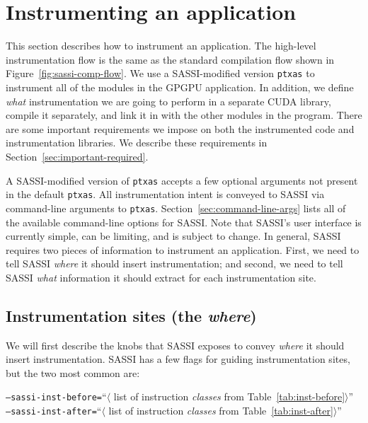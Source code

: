 \section{Instrumenting an application}

This section describes how to instrument an application.  The
high-level instrumentation flow is the same as the standard
compilation flow shown in Figure~\ref{fig:sassi-comp-flow}.  We use a
SASSI-modified version \texttt{ptxas} to instrument all of the modules
in the GPGPU application.  In addition, we define \emph{what}
instrumentation we are going to perform in a separate CUDA library,
compile it separately, and link it in with the other modules in the
program.  There are some important requirements we impose on both the
instrumented code and instrumentation libraries.  We describe these
requirements in Section~\ref{sec:important-required}.

A SASSI-modified version of \texttt{ptxas} accepts a few optional
arguments not present in the default \texttt{ptxas}.  All
instrumentation intent is conveyed to SASSI via command-line arguments
to \texttt{ptxas}.  Section~\ref{sec:command-line-args} lists all of
the available command-line options for SASSI.  Note that SASSI's user
interface is currently simple, can be limiting, and is subject to
change. In general, SASSI requires two pieces of information to
instrument an application.  First, we need to tell SASSI \emph{where}
it should insert instrumentation; and second, we need to tell SASSI
\emph{what} information it should extract for each instrumentation
site.

\subsection{Instrumentation sites (the \emph{where})}

We will first describe the knobs that SASSI exposes to convey
\emph{where} it should insert instrumentation.  SASSI has a few flags
for guiding instrumentation sites, but the two most common are:\\
\begin{center}
\texttt{--sassi-inst-before=}``$\langle$ list of instruction
\emph{classes} from Table~\ref{tab:inst-before}$\rangle$'' \\

\texttt{--sassi-inst-after=}``$\langle$ list of instruction
\emph{classes} from Table~\ref{tab:inst-after}$\rangle$'' \\
\end{center}

